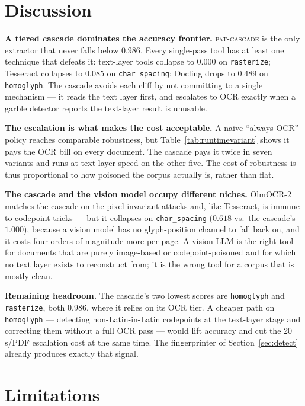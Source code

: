 \documentclass[11pt]{article}
\newcommand{\variant}[1]{\texttt{#1}}
\begin{document}
\section{Discussion}
\label{sec:discussion}

\textbf{A tiered cascade dominates the accuracy frontier.}
\textsc{pat-cascade} is the only extractor that never falls below
$0.986$. Every single-pass tool has at least one technique that defeats
it: text-layer tools collapse to $0.000$ on \variant{rasterize};
Tesseract collapses to $0.085$ on \variant{char\_spacing}; Docling drops
to $0.489$ on \variant{homoglyph}. The cascade avoids each cliff by not
committing to a single mechanism --- it reads the text layer first, and
escalates to OCR exactly when a garble detector reports the text-layer
result is unusable.

\textbf{The escalation is what makes the cost acceptable.} A naive
``always OCR'' policy reaches comparable robustness, but
Table~\ref{tab:runtimevariant} shows it pays the OCR bill on every
document. The cascade pays it twice in seven variants and runs at
text-layer speed on the other five. The cost of robustness is thus
proportional to how poisoned the corpus actually is, rather than flat.

\textbf{The cascade and the vision model occupy different niches.}
OlmOCR-2 matches the cascade on the pixel-invariant attacks and, like
Tesseract, is immune to codepoint tricks --- but it collapses on
\variant{char\_spacing} ($0.618$ vs.\ the cascade's $1.000$), because a
vision model has no glyph-position channel to fall back on, and it costs
four orders of magnitude more per page. A vision LLM is the right tool
for documents that are purely image-based or codepoint-poisoned and for
which no text layer exists to reconstruct from; it is the wrong tool for
a corpus that is mostly clean.

\textbf{Remaining headroom.} The cascade's two lowest scores are
\variant{homoglyph} and \variant{rasterize}, both $0.986$, where it
relies on its OCR tier. A cheaper path on \variant{homoglyph} ---
detecting non-Latin-in-Latin codepoints at the text-layer stage and
correcting them without a full OCR pass --- would lift accuracy and cut
the 20\,s/PDF escalation cost at the same time. The fingerprinter of
Section~\ref{sec:detect} already produces exactly that signal.

\section{Limitations}
\label{sec:limitations}
\end{document}
